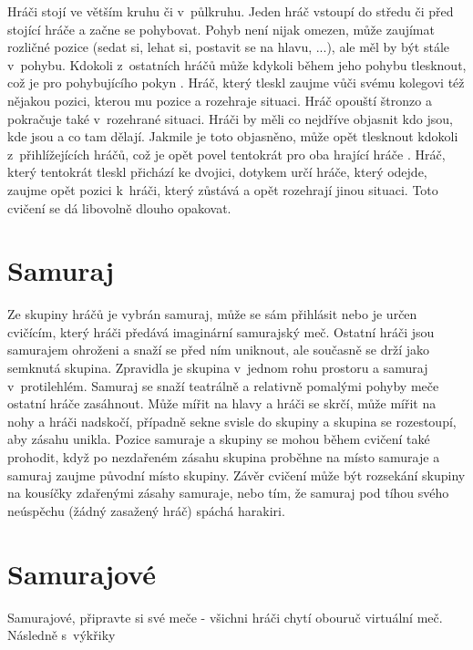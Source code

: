 Hráči stojí ve větším kruhu či v~půlkruhu. Jeden hráč vstoupí do středu či před stojící hráče a začne se pohybovat. Pohyb není nijak omezen, může zaujímat rozličné pozice (sedat si, lehat si, postavit se na hlavu, ...), ale měl by být stále v~pohybu. Kdokoli z~ostatních hráčů může kdykoli během jeho pohybu tlesknout, což je pro pohybujícího pokyn . Hráč, který tleskl zaujme vůči svému kolegovi též nějakou pozici, kterou mu pozice  a rozehraje situaci. Hráč opouští štronzo a pokračuje také v~rozehrané situaci. Hráči by měli co nejdříve objasnit kdo jsou, kde jsou a co tam dělají. Jakmile je toto objasněno, může opět tlesknout kdokoli z~přihlížejících hráčů, což je opět povel tentokrát pro oba hrající hráče . Hráč, který tentokrát tleskl přichází ke dvojici, dotykem určí hráče, který odejde, zaujme opět pozici k~hráči, který zůstává a opět rozehrají jinou situaci. Toto cvičení se dá libovolně dlouho opakovat. 
 
 
 
 
\needspace{5cm} \section{Samuraj} \label{samuraj} Ze skupiny hráčů je vybrán samuraj, může se sám přihlásit nebo je určen cvičícím, který hráči předává imaginární samurajský meč. Ostatní hráči jsou samurajem ohroženi a snaží se před ním uniknout, ale současně se drží jako semknutá skupina. Zpravidla je skupina v~jednom rohu prostoru a samuraj v~protilehlém. Samuraj se snaží teatrálně a relativně pomalými pohyby meče ostatní hráče zasáhnout. Může mířit na hlavy a hráči se skrčí, může mířit na nohy a hráči nadskočí, případně sekne svisle do skupiny a skupina se rozestoupí, aby zásahu unikla. Pozice samuraje a skupiny se mohou během cvičení také prohodit, když po nezdařeném zásahu skupina proběhne na místo samuraje a samuraj zaujme původní místo skupiny. Závěr cvičení může být rozsekání skupiny na kousíčky zdařenými zásahy samuraje, nebo tím, že samuraj pod tíhou svého neúspěchu (žádný zasažený hráč) spáchá harakiri. 
 
 
 
 
 
\needspace{5cm} \section{Samurajové} \label{samurajové} Samurajové, připravte si své meče - všichni hráči chytí obouruč virtuální meč. 
Následně s~výkřiky 
 
